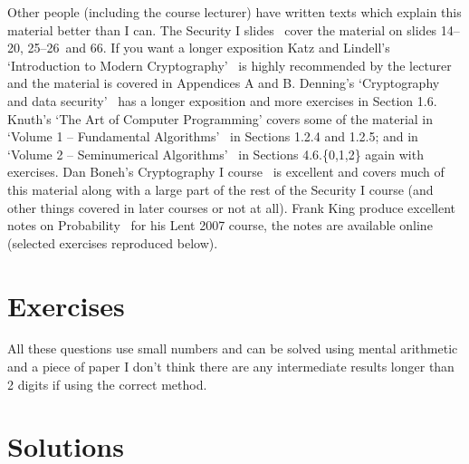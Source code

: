\documentclass[11pt,a4paper]{article}
\newif\ifshowanswers
\newcommand{\slidesinitialmath}{14--20}
\newcommand{\slidesprobability}{25--26}
\newcommand{\slidesbirthday}{66}
\newcommand{\slidesall}{\slidesinitialmath, \slidesprobability\ and \slidesbirthday}
\begin{document}
Other people (including the course lecturer) have written texts which explain this material better than I can.
The Security I slides~\cite{SecurityISlides} cover the material on slides \slidesall.
If you want a longer exposition Katz and Lindell's `Introduction to Modern Cryptography'~\cite{Katz2008} is highly recommended by the lecturer and the material is covered in Appendices A and B.
Denning's `Cryptography and data security'~\cite{Denning1982} has a longer exposition and more exercises in Section 1.6.
Knuth's `The Art of Computer Programming' covers some of the material in `Volume 1 -- Fundamental Algorithms'~\cite{KnuthTAOCP1} in Sections 1.2.4 and 1.2.5; and in `Volume 2 -- Seminumerical Algorithms'~\cite{KnuthTAOCP2} in Sections 4.6.\{0,1,2\} again with exercises.
Dan Boneh's Cryptography I course~\cite{CryptoI} is excellent and covers much of this material along with a large part of the rest of the Security I course (and other things covered in later courses or not at all).
Frank King produce excellent notes on Probability~\cite{King2007} for his Lent 2007 course, the notes are available online (selected exercises reproduced below).

\section*{Exercises}
All these questions use small numbers and can be solved using mental arithmetic and a piece of paper I don't think there are any intermediate results longer than 2 digits if using the correct method.
\twocolumn
\showanswersfalse


\pagebreak
\section*{Solutions}
\showanswerstrue


\onecolumn

\printbibliography
\end{document}
